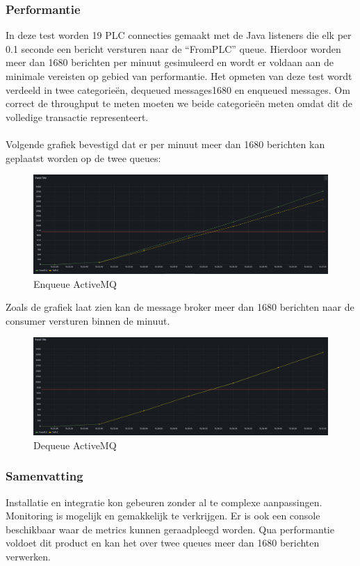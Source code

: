 \subsubsection{Performantie}
In deze test worden 19 PLC connecties gemaakt met de Java listeners die elk per 0.1 seconde een bericht versturen naar de  ``FromPLC'' queue.
Hierdoor worden meer dan 1680 berichten per minuut gesimuleerd en wordt er voldaan aan de minimale vereisten op gebied van performantie.
Het opmeten van deze test wordt verdeeld in twee categorieën, dequeued messages1680 en enqueued messages.
Om correct de throughput te meten moeten we beide categorieën meten omdat dit de volledige transactie representeert. 
\\\\
Volgende grafiek bevestigd dat er per minuut meer dan 1680 berichten kan geplaatst worden op de twee queues:
\begin{figure}[h!]
  \centering
  \includegraphics[width=.9\textwidth]{img/amq-enqueue-count.png}
  \caption{\label{fig:amq_enqueue_count}Enqueue ActiveMQ}
\end{figure}

Zoals de grafiek laat zien kan de message broker meer dan 1680 berichten naar de consumer versturen binnen de minuut.
\begin{figure}[h!]
  \centering
  \includegraphics[width=.9\textwidth]{img/amq-dequeue-count.png}
  \caption{\label{fig:amq_dequeue_count}Dequeue ActiveMQ}
\end{figure}

\subsubsection{Samenvatting}
Installatie en integratie kon gebeuren zonder al te complexe aanpassingen.
Monitoring is mogelijk en gemakkelijk te verkrijgen. 
Er is ook een console beschikbaar waar de metrics kunnen geraadpleegd worden.
Qua performantie voldoet dit product en kan het over twee queues meer dan 1680 berichten verwerken.
  

